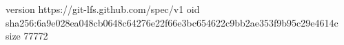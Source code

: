 version https://git-lfs.github.com/spec/v1
oid sha256:6a9e028ea048cb0648c64276e22f66e3bc654622c9bb2ae353f9b95c29e4614c
size 77772

